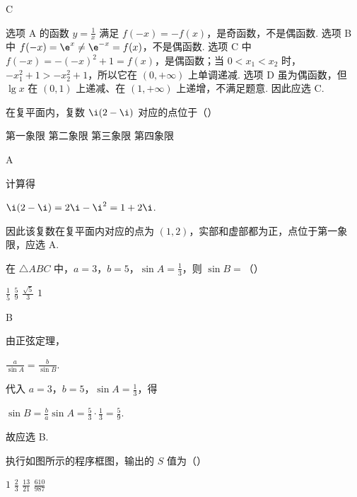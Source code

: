 \begin{answer}
C
\end{answer}

\begin{solution}
选项 A 的函数 \(y=\frac{1}{x}\) 满足 \(f(-x)=-f(x)\)，是奇函数，不是偶函数. 选项 B 中 \(f(-x)=\e^x\neq\e^{-x}=f(x)\)，不是偶函数. 选项 C 中 \(f(-x)=-(-x)^2+1=f(x)\)，是偶函数；当 \(0<x_1<x_2\) 时，\(-x_1^2+1>-x_2^2+1\)，所以它在 \((0,+\infty)\) 上单调递减. 选项 D 虽为偶函数，但 \(\lg x\) 在 \((0,1)\) 上递减、在 \((1,+\infty)\) 上递增，不满足题意. 因此应选 C.
\end{solution}

\begin{problem}
在复平面内，复数 \( \i(2 - \i) \) 对应的点位于（\quad）

\choices
    {第一象限}
    {第二象限}
    {第三象限}
    {第四象限}
\end{problem}

\begin{answer}
A
\end{answer}

\begin{solution}
计算得

\(\i(2-\i)=2\i-\i^2=1+2\i\).

因此该复数在复平面内对应的点为 \((1,2)\)，实部和虚部都为正，点位于第一象限，应选 A.
\end{solution}

\begin{problem}
在 \(\triangle ABC\) 中，\(a = 3\)，\(b = 5\)，\(\sin A = \frac{1}{3}\)，则 \(\sin B =\)（\quad）

\choices
    {\( \frac{1}{5} \)}
    {\( \frac{5}{9} \)}
    {\( \frac{\sqrt{5}}{3} \)}
    {\(1\)}
\end{problem}

\begin{answer}
B
\end{answer}

\begin{solution}
由正弦定理，

\(\frac{a}{\sin A}=\frac{b}{\sin B}\).

代入 \(a=3\)，\(b=5\)，\(\sin A=\frac{1}{3}\)，得

\(\sin B=\frac{b}{a}\sin A=\frac{5}{3}\cdot\frac{1}{3}=\frac{5}{9}\).

故应选 B.
\end{solution}

\begin{problem}
执行如图所示的程序框图，输出的 \(S\) 值为（\quad）


\choices
    {\(1\)}
    {\( \frac{2}{3} \)}
    {\( \frac{13}{21} \)}
    {\( \frac{610}{987} \)}
\end{problem}

